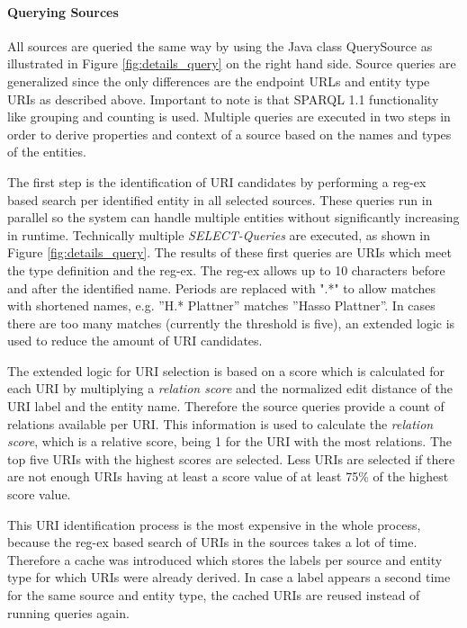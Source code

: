 \paragraph{Querying Sources}
All sources are queried the same way by using the Java class QuerySource as illustrated in Figure \ref{fig:details_query} on the right hand side. Source queries are generalized since the only differences are the endpoint URLs and entity type URIs as described above. Important to note is that SPARQL 1.1 functionality like grouping and counting is used. Multiple queries are executed in two steps in order to derive properties and context of a source based on the names and types of the entities.

The first step is the identification of URI candidates by performing a reg-ex based search per identified entity in all selected sources. These queries run in parallel so the system can handle multiple entities without significantly increasing in runtime. Technically multiple \textit{SELECT-Queries} are executed, as shown in Figure \ref{fig:details_query}. The results of these first queries are URIs which meet the type definition and the reg-ex. The reg-ex allows up to 10 characters before and after the identified name. Periods are replaced with ".*" to allow matches with shortened names,  e.g. ''H.* Plattner'' matches ''Hasso Plattner''. In cases there are too many matches (currently the threshold is five), an extended logic is used to reduce the amount of URI candidates. 


The extended logic for URI selection is based on a score which is calculated for each URI by multiplying a \textit{relation score} and the normalized edit distance of the URI label and the entity name. Therefore the source queries provide a count of relations available per URI. This information is used to calculate the \textit{relation score}, which is a relative score, being 1 for the URI with the most relations. The top five URIs with the highest scores are selected. Less URIs are selected if there are not enough URIs having at least a score value of at least 75\% of the highest score value.

This URI identification process is the most expensive in the whole process, because the reg-ex based search of URIs in the sources takes a lot of time. Therefore a cache was introduced which stores the labels per source and entity type for which URIs were already derived. In case a label appears a second time for the same source and entity type, the cached URIs are reused instead of running queries again.


